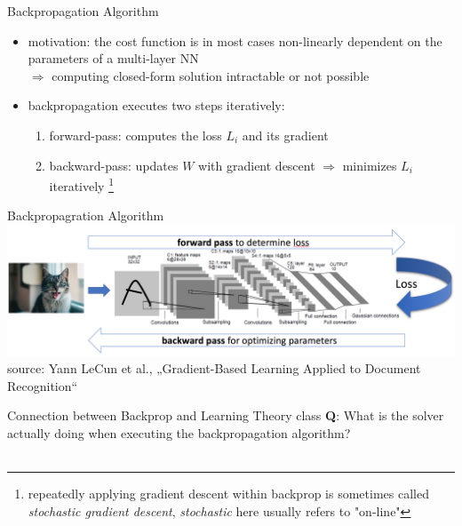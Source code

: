 \documentclass{beamer}
\begin{document}
\begin{frame}{Backpropagation Algorithm}

\begin{itemize}
\item motivation: the cost function is in most cases non-linearly dependent on the parameters of a multi-layer NN\\
$\Rightarrow$ computing closed-form solution intractable or not possible
\item backpropagation executes two steps iteratively:
\begin{enumerate}
\item forward-pass: computes the loss $L_i$ and its gradient 
\item backward-pass: updates $W$ with gradient descent $\Rightarrow$ minimizes $L_i$ iteratively \footnote{repeatedly applying gradient descent within backprop is sometimes called \emph{stochastic gradient descent}, \emph{stochastic} here usually refers to "on-line"}
\end{enumerate} 
\end{itemize}
\end{frame}

\begin{frame}{Backpropagration Algorithm}
\includegraphics[width=1.1\textwidth]{backprop}\\

source: Yann LeCun et al., „Gradient-Based Learning Applied to Document Recognition“
\end{frame}

\begin{frame}{Connection between Backprop and Learning Theory class}
\textbf{Q}: What is the solver actually doing when executing the backpropagation algorithm?\\
\\
\end{frame}
\end{document}

